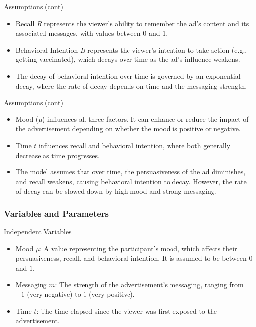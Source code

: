 \documentclass[12pt]{beamer}
\begin{document}
\begin{frame}
\begin{block}{Assumptions (cont)}
\begin{itemize}
    \item Recall \( R \) represents the viewer's ability to remember the ad's content and its associated messages, with values between 0 and 1.
    \item Behavioral Intention \( B \) represents the viewer's intention to take action (e.g., getting vaccinated), which decays over time as the ad's influence weakens.
    \item The decay of behavioral intention over time is governed by an exponential decay, where the rate of decay depends on time and the messaging strength.
\end{itemize}
\end{block}
\end{frame}
\begin{frame}
\begin{block}{Assumptions (cont)}
\begin{itemize}
    \item Mood (\( \mu \)) influences all three factors. It can enhance or reduce the impact of the advertisement depending on whether the mood is positive or negative.
    \item Time \( t \) influences recall and behavioral intention, where both generally decrease as time progresses.
    \item The model assumes that over time, the persuasiveness of the ad diminishes, and recall weakens, causing behavioral intention to decay. However, the rate of decay can be slowed down by high mood and strong messaging.
\end{itemize}
\end{block}
\end{frame}

\begin{frame}
\frametitle{Variables and Parameters}
\begin{block}{Independent Variables}
\begin{itemize}
    \item Mood \( \mu \): A value representing the participant's mood, which affects their persuasiveness, recall, and behavioral intention. It is assumed to be between \( 0 \) and \( 1 \).
    \item Messaging \( m \): The strength of the advertisement's messaging, ranging from \( -1 \) (very negative) to \( 1 \) (very positive).
    \item Time \( t \): The time elapsed since the viewer was first exposed to the advertisement.
\end{itemize}
\end{block}
\end{frame}
\end{document}
